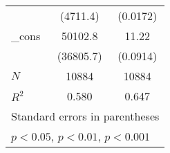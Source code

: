 {\begin{tabular}{l*{2}{c}}
            &    (4711.4)         &    (0.0172)         \\
[1em]
\_cons      &     50102.8         &       11.22\sym{***}\\
            &   (36805.7)         &    (0.0914)         \\
\hline
\(N\)       &       10884         &       10884         \\
\(R^{2}\)   &       0.580         &       0.647         \\
\hline\hline
\multicolumn{3}{l}{\footnotesize Standard errors in parentheses}\\
\multicolumn{3}{l}{\footnotesize \sym{*} \(p<0.05\), \sym{**} \(p<0.01\), \sym{***} \(p<0.001\)}\\
\end{tabular}
}
